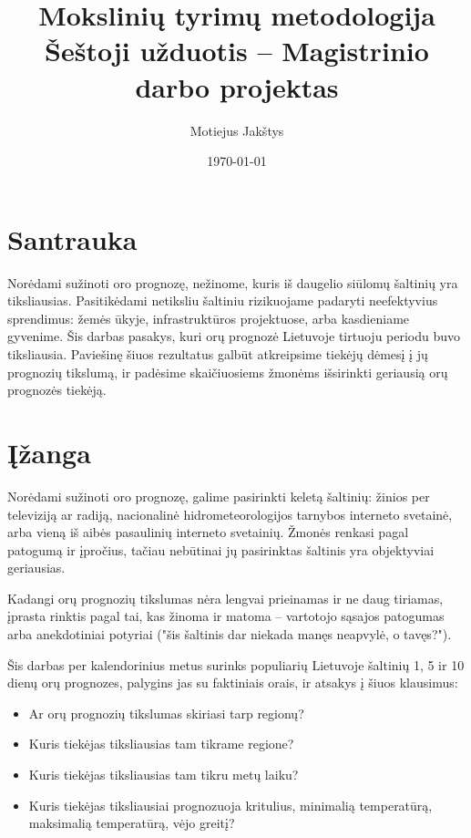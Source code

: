 \documentclass{article}
\title{
    Mokslinių tyrimų metodologija\\ \vspace{4mm} 
    Šeštoji užduotis -- Magistrinio darbo projektas
}
\author{Motiejus Jakštys}
\date{\today}
\begin{document}
\maketitle

\section{Santrauka}

Norėdami sužinoti oro prognozę, nežinome, kuris iš daugelio siūlomų šaltinių
yra tiksliausias. Pasitikėdami netiksliu šaltiniu rizikuojame padaryti
neefektyvius sprendimus: žemės ūkyje, infrastruktūros projektuose, arba
kasdieniame gyvenime. Šis darbas pasakys, kuri orų prognozė Lietuvoje tirtuoju
periodu buvo tiksliausia. Paviešinę šiuos rezultatus galbūt atkreipsime tiekėjų
dėmesį į jų prognozių tikslumą, ir padėsime skaičiuosiems žmonėms išsirinkti
geriausią orų prognozės tiekėją.

\section{Įžanga}

Norėdami sužinoti oro prognozę, galime pasirinkti keletą šaltinių: žinios per
televiziją ar radiją, nacionalinė hidrometeorologijos tarnybos interneto
svetainė, arba vieną iš aibės pasaulinių interneto svetainių. Žmonės renkasi
pagal patogumą ir įpročius, tačiau nebūtinai jų pasirinktas šaltinis yra
objektyviai geriausias.

Kadangi orų prognozių tikslumas nėra lengvai prieinamas ir ne daug tiriamas,
įprasta rinktis pagal tai, kas žinoma ir matoma -- vartotojo sąsajos patogumas
arba anekdotiniai potyriai ("šis šaltinis dar niekada manęs neapvylė, o
tavęs?").

Šis darbas per kalendorinius metus surinks populiarių Lietuvoje šaltinių 1, 5
ir 10 dienų orų prognozes, palygins jas su faktiniais orais, ir atsakys į šiuos
klausimus:

\begin{itemize}
    \item Ar orų prognozių tikslumas skiriasi tarp regionų?
    \item Kuris tiekėjas tiksliausias tam tikrame regione?
    \item Kuris tiekėjas tiksliausias tam tikru metų laiku?
    \item Kuris tiekėjas tiksliausiai prognozuoja kritulius, minimalią
        temperatūrą, maksimalią temperatūrą, vėjo greitį?
\end{itemize}
\end{document}
